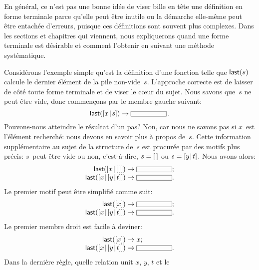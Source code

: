 En général, ce n'est pas une bonne idée de viser bille en tête une
définition en forme terminale parce qu'elle peut être inutile ou la
démarche elle-même peut être entachée d'erreurs, puisque ces
définitions sont souvent plus complexes. Dans les sections et
chapitres qui viennent, nous expliquerons quand une forme terminale
est désirable et comment l'obtenir en suivant une méthode
systématique.

Considérons l'exemple simple qu'est la définition d'une fonction
 telle que \(\textsf{last}(s)\) calcule le dernier élément de
la pile non-vide~\(s\). L'approche correcte est de laisser de côté
toute forme terminale et de viser le c{\oe}ur du sujet. Nous savons
que~\(s\) ne peut être vide, donc commençons par le membre gauche suivant:
\begin{equation*}
\fun{last}(\cons{x}{s}) \rightarrow \fbcode{CCCCCCC}\,.
\end{equation*}
Pouvons-nous atteindre le résultat d'un pas? Non, car nous ne savons
pas si \(x\)~est l'élément recherché: nous devons en savoir plus à
propos de~\(s\). Cette information supplémentaire au sujet de la
structure de~\(s\) est procurée par des motifs plus précis: \(s\)~peut
être vide ou non, c'est-à-dire, \(s = [\,]\) ou \(s=[{y}\!\mid\!{t}]\). Nous
avons alors:
\begin{equation*}
\begin{array}{r@{\;}c@{\;}l}
\fun{last}(\cons{x}{\el}) & \rightarrow & \fbcode{CCCCCCC};\\
\fun{last}(\cons{x}{\cons{y}{t}}) & \rightarrow & \fbcode{CCCCCCC}.
\end{array}
\end{equation*}
Le premier motif peut être simplifié comme suit:
\begin{equation*}
\begin{array}{r@{\;}c@{\;}l}
\fun{last}([x]) & \rightarrow & \fbcode{CCCCCCC};\\
\fun{last}(\cons{x}{\cons{y}{t}}) & \rightarrow & \fbcode{CCCCCCC}.
\end{array}
\end{equation*}
Le premier membre droit est facile à deviner:
\begin{equation*}
\begin{array}{r@{\;}c@{\;}l}
\fun{last}([x]) & \rightarrow & x;\\
\fun{last}(\cons{x}{\cons{y}{t}}) & \rightarrow & \fbcode{CCCCCCC}.
\end{array}
\end{equation*}
Dans la dernière règle, quelle relation unit \(x\), \(y\), \(t\) et le
